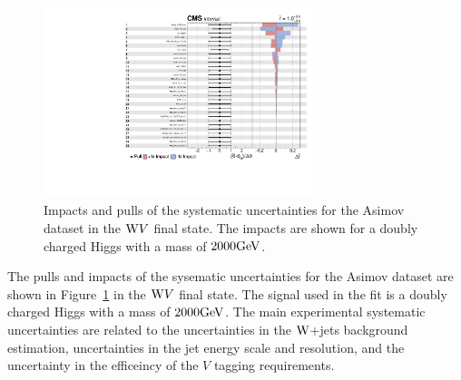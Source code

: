 \begin{figure}[!htbp]
\centering
\includegraphics[width=0.7\textwidth]{Plots/plots/impacts_datacard.pdf}
\caption{Impacts and pulls of the systematic uncertainties for the Asimov dataset in the $\mathrm{W} V$ final state. The impacts are shown for a doubly charged Higgs with a mass of $2000\mathrm{GeV}$.  
}
\label{fig:pulls}
\end{figure}
The pulls and impacts of the sysematic uncertainties for the Asimov dataset are shown in Figure~\ref{fig:pulls} in the  $\mathrm{W} V$ final state. The signal used in the fit is a doubly charged Higgs with a mass of $2000\mathrm{GeV}$. The main experimental systematic uncertainties are related to the uncertainties in the $\mathrm{W}$+jets background estimation, uncertainties in the jet energy scale and resolution, and  the uncertainty in the efficeincy of the $V$ tagging requirements. 






